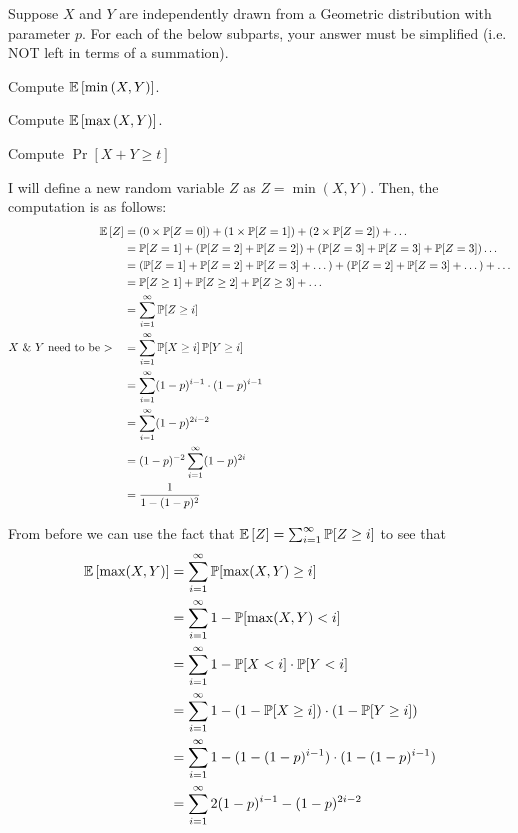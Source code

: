 \documentclass[11pt]{article}
\begin{document}
Suppose $X$ and $Y$ are independently drawn from a Geometric distribution with 
parameter $p$. For each of the below subparts, your answer must be simplified 
(i.e. NOT left in terms of a summation).

\begin{Parts}

\Part Compute $\operatorname{\mathbb{E}}\left[\min\left(X,Y\right)\right]$.

\Part Compute $\operatorname{\mathbb{E}}\left[\max\left(X,Y\right)\right]$.

\Part Compute $\Pr[X + Y \ge t]$    

\end{Parts}

\begin{solution}
    
\begin{Parts}
    
\Part I will define a new random variable $Z$ as $Z = \min(X,Y)$. Then, the 
computation is as follows:
\[
    \begin{split}
        \operatorname{\mathbb{E}}\left[Z\right] &= (0 \times \operatorname{\mathbb{P}}[Z=0]) + (1 \times \operatorname{\mathbb{P}}[Z=1]) + (2 \times \operatorname{\mathbb{P}}[Z=2]) + \dots \\
        &= \operatorname{\mathbb{P}}[Z=1] + (\operatorname{\mathbb{P}}[Z=2] + \operatorname{\mathbb{P}}[Z=2]) + (\operatorname{\mathbb{P}}[Z=3] +  \operatorname{\mathbb{P}}[Z=3] + \operatorname{\mathbb{P}}[Z=3]) \dots \\
        &= (\operatorname{\mathbb{P}}[Z=1] + \operatorname{\mathbb{P}}[Z=2] + \operatorname{\mathbb{P}}[Z=3] + \dots) + (\operatorname{\mathbb{P}}[Z=2] + \operatorname{\mathbb{P}}[Z=3] + \dots) + \dots \\
        &= \operatorname{\mathbb{P}}[Z \geq 1] + \operatorname{\mathbb{P}}[Z \geq 2] + \operatorname{\mathbb{P}}[Z \geq 3] + \dots \\
        &= \sum_{i=1}^{\infty} \operatorname{\mathbb{P}}[Z \geq i] \\
        \text{$X$ \& $Y$ need to be >} \quad &= \sum_{i=1}^{\infty} \operatorname{\mathbb{P}}[X \geq i] \operatorname{\mathbb{P}}[Y \geq i] \\
        &= \sum_{i=1}^{\infty} (1-p)^{i-1} \cdot (1-p)^{i-1} \\
        &= \sum_{i=1}^{\infty} (1-p)^{2i-2} \\
        &= (1-p)^{-2} \sum_{i=1}^{\infty} (1-p)^{2i} \\
        &= \frac{1}{1-(1-p)^2}
    \end{split}
\]

\Part From before we can use the fact that $\operatorname{\mathbb{E}}\left[Z\right] = \sum_{i=1}^{\infty} 
\operatorname{\mathbb{P}}[Z \geq i]$ to see that 
\[
    \begin{split}
        \operatorname{\mathbb{E}}\left[\max(X, Y)\right] &= \sum_{i=1}^{\infty} \operatorname{\mathbb{P}}[\max(X, Y) \geq i] \\
        &= \sum_{i=1}^{\infty} 1 - \operatorname{\mathbb{P}}[\max(X, Y) < i] \\
        &= \sum_{i=1}^{\infty} 1 - \operatorname{\mathbb{P}}[X < i] \cdot \operatorname{\mathbb{P}}[Y < i] \\
        &= \sum_{i=1}^{\infty} 1 - (1 - \operatorname{\mathbb{P}}[X \geq i]) \cdot (1 - \operatorname{\mathbb{P}}[Y \geq i]) \\
        &= \sum_{i=1}^{\infty} 1 - (1 - (1-p)^{i-1}) \cdot (1 - (1-p)^{i-1}) \\
        &= \sum_{i=1}^{\infty} 2(1-p)^{i-1} - (1-p)^{2i - 2}
    \end{split}
\]


\end{Parts}
\end{solution}
\end{document}
